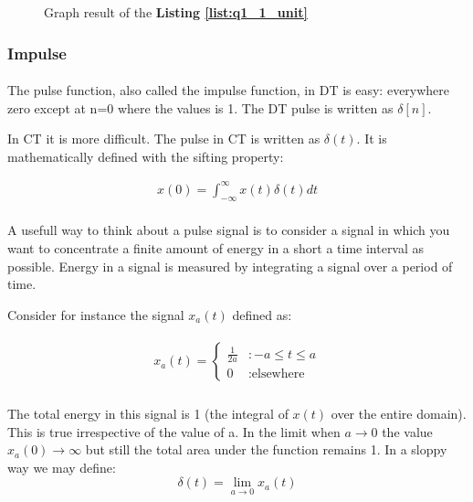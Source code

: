 
\begin{figure}[H]
  \scalebox{0.6}{}
  \caption{Graph result of the \textbf{Listing \ref{list:q1_1_unit}}}
  \label{fig:Q1-1-unit}
\end{figure}

\subsubsection{Impulse}
\paragraph{}The pulse function, also called the impulse function, 
in DT is easy: everywhere zero except at n=0 where the 
values is 1. The DT pulse is written as $\delta[n]$.

In CT it is more difficult. The pulse in CT is written 
as $\delta(t)$. It is mathematically defined with the sifting property:

\begin{align}
x(0) = \int_{-\infty}^{\infty} x(t)\delta(t)dt
\end{align}

\paragraph{}A usefull way to think about a pulse signal 
is to consider a signal in which you want to concentrate 
a finite amount of energy in a short a time interval as 
possible. Energy in a signal is measured by integrating a 
signal over a period of time.

Consider for instance the signal $x_a(t)$ defined as:

\begin{align}    
\begin{split}x_a(t) = \begin{cases}
       \frac{1}{2a} &: -a \leq t \leq a\\
       0 &: \text{elsewhere}
       \end{cases}\end{split}
\end{align}

\paragraph{}The total energy in this signal is 1 
(the integral of $x(t)$ over the entire domain). 
This is true irrespective of the value of a. In the 
limit when $a\rightarrow 0$ the value $x_a(0)\rightarrow \infty$ but still the total 
area under the function remains 1. In a sloppy way we 
may define:
\[
    \delta(t) = \lim_{a\rightarrow0} x_a(t)
    \]
